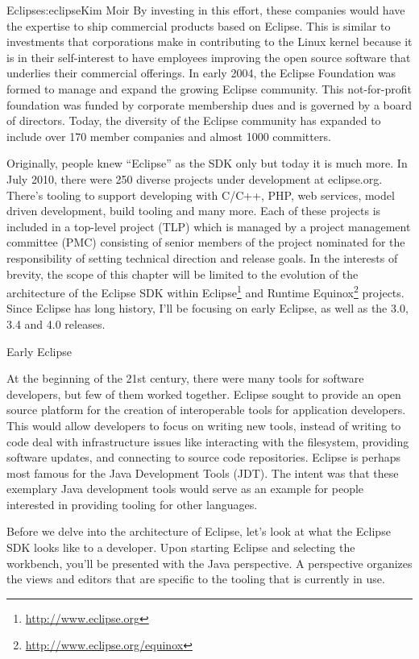 \begin{aosachapter}{Eclipse}{s:eclipse}{Kim Moir}
By investing in this effort, these companies would have the expertise
to ship commercial products based on Eclipse. This is similar to
investments that corporations make in contributing to the Linux kernel
because it is in their self-interest to have employees improving the
open source software that underlies their commercial offerings. In
early 2004, the Eclipse Foundation was formed to manage and expand the
growing Eclipse community.  This not-for-profit foundation was funded
by corporate membership dues and is governed by a board of
directors. Today, the diversity of the Eclipse community has expanded
to include over 170 member companies and almost 1000 committers.

Originally, people knew ``Eclipse'' as the SDK only but today it is
much more.  In July 2010, there were 250 diverse projects under
development at eclipse.org. There's tooling to support developing with
C/C++, PHP, web services, model driven development, build tooling and
many more. Each of these projects is included in a top-level project
(TLP) which is managed by a project management committee (PMC)
consisting of senior members of the project nominated for the
responsibility of setting technical direction and release goals. In
the interests of brevity, the scope of this chapter will be limited to
the evolution of the architecture of the Eclipse SDK within 
Eclipse\footnote{\url{http://www.eclipse.org}} and Runtime 
Equinox\footnote{\url{http://www.eclipse.org/equinox}} projects. Since Eclipse has
long history, I'll be focusing on early Eclipse, as well as the 3.0,
3.4 and 4.0 releases.

\begin{aosasect1}{Early Eclipse}

At the beginning of the 21st century, there were many tools for
software developers, but few of them worked together. Eclipse sought
to provide an open source platform for the creation of interoperable
tools for application developers. This would allow
developers to focus on writing new tools, instead of
writing to code deal with infrastructure issues like interacting
with the filesystem, providing software updates, and connecting to
source code repositories. Eclipse is perhaps most famous for the Java
Development Tools (JDT). The intent was that these exemplary Java
development tools would serve as an example for people interested in
providing tooling for other languages.

Before we delve into the architecture of Eclipse, let's look at what
the Eclipse SDK looks like to a developer.  Upon starting Eclipse and
selecting the workbench, you'll be presented with the Java
perspective. A perspective organizes the views and editors that are
specific to the tooling that is currently in use.


\end{aosasect1}
\end{aosachapter}
